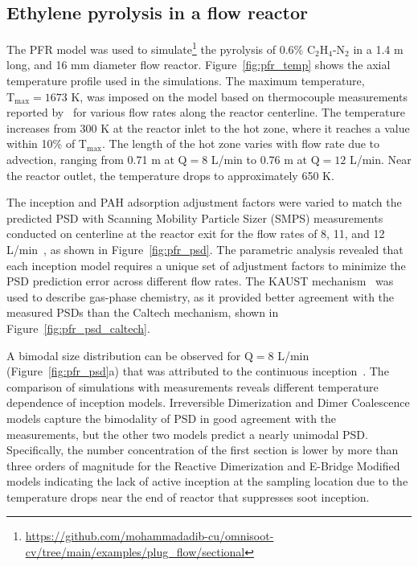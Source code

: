 \subsection{Ethylene pyrolysis in a flow reactor}
The PFR model was used to simulate\footnote{\href{https://github.com/mohammadadib-cu/omnisoot-cv/tree/main/examples/plug_flow/sectional}{https://github.com/mohammadadib-cu/omnisoot-cv/tree/main/examples/plug\_flow/sectional}} the pyrolysis of 0.6\% $\mathrm{C_2H_4}$-$\mathrm{N_2}$ in a 1.4 m long, and 16 mm diameter flow reactor. Figure~\ref{fig:pfr_temp} shows the axial temperature profile used in the simulations. The maximum temperature, $\mathrm{T_{max}} = 1673$ K, was imposed on the model based on thermocouple measurements reported by~\citet{mei2019quantitative} for various flow rates along the reactor centerline. The temperature increases from 300 K at the reactor inlet to the hot zone, where it reaches a value within 10\% of $\mathrm{T_{max}}$. The length of the hot zone varies with flow rate due to advection, ranging from 0.71 m at $\mathrm{Q}=8$ L/min to 0.76 m at $\mathrm{Q}=12$ L/min. Near the reactor outlet, the temperature drops to approximately 650 K.

The inception and PAH adsorption adjustment factors were varied to match the predicted PSD with Scanning Mobility Particle Sizer
(SMPS) measurements conducted on centerline at the reactor exit for the flow rates of 8, 11, and 12 L/min~\citep{mei2019quantitative}, as shown in Figure~\ref{fig:pfr_psd}. The parametric analysis revealed that each inception model requires a unique set of adjustment factors to minimize the PSD prediction error across different flow rates. The KAUST mechanism~\citep{wang2013pah} was used to describe gas-phase chemistry, as it provided better agreement with the measured PSDs than the Caltech mechanism, shown in Figure~\ref{fig:pfr_psd_caltech}.

A bimodal size distribution can be observed for $\mathrm{Q}=8$ L/min (Figure~\ref{fig:pfr_psd}a) that was attributed to the continuous inception~\citep{zhao2003measurement}. The comparison of simulations with measurements reveals different temperature dependence of inception models. Irreversible Dimerization and Dimer Coalescence models capture the bimodality of PSD in good agreement with the measurements, but the other two models predict a nearly unimodal PSD. Specifically, the number concentration of the first section is lower by more than three orders of magnitude for the Reactive Dimerization and E-Bridge Modified models indicating the lack of active inception at the sampling location due to the temperature drops near the end of reactor that suppresses soot inception.

